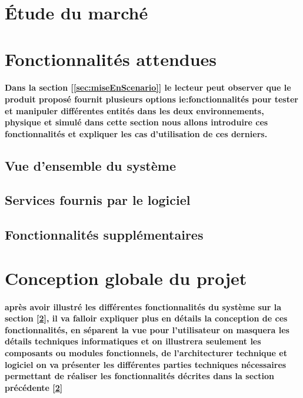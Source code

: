 \section{Étude du marché} \label{sec:etudeMarche}
\paragraph{}


\section{Fonctionnalités attendues} \label{sec:foncAttendues}
\paragraph{Dans la section [\ref{sec:miseEnScenario}] le lecteur peut observer que le produit proposé fournit plusieurs options ie:fonctionnalités pour tester et manipuler différentes entités dans les deux environnements, physique et simulé dans cette section nous allons introduire ces fonctionnalités et expliquer les cas d'utilisation de ces derniers.}

\subsection{Vue d’ensemble du système} \label{subsec:vueEns}

\subsection{Services fournis par le logiciel} \label{subsec:serLogiciel}

\subsection{Fonctionnalités supplémentaires} \label{subsec:foncSupplementaires}

\section{Conception globale du projet} \label{sec:conception}
\paragraph{après avoir illustré les différentes fonctionnalités du système sur la section [\ref{sec:foncAttendues}], il va falloir expliquer plus en détails la conception de ces fonctionnalités, en séparent la vue pour l'utilisateur on masquera les détails techniques informatiques et on illustrera seulement les composants ou modules fonctionnels, de l'architecturer technique et logiciel on va présenter les différentes parties techniques nécessaires permettant de réaliser les fonctionnalités décrites dans la section précédente [\ref{sec:foncAttendues}]}

